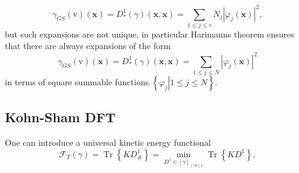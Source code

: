 \documentclass[aps,preprint]{revtex4}%
\begin{document}
\begin{equation}
\gamma_{GS}\left(  \mathrm{v}\right)  \left(  \mathbf{x}\right)  =D_{\ast}%
^{1}\left(  \gamma\right)  \left(  \mathbf{x,x}\right)  =\sum_{1\leq j\leq
r}N_{j}\left\vert \varphi_{j}\left(  \mathbf{x}\right)  \right\vert ^{2},
\end{equation}
but such expansions are not unique, in particular Harimanns \cite{Harimann}
theorem ensures that there are always expansions of the form
\begin{equation}
\gamma_{GS}\left(  \mathrm{v}\right)  \left(  \mathbf{x}\right)  =D_{\ast}%
^{1}\left(  \gamma\right)  \left(  \mathbf{x,x}\right)  =\sum_{1\leq j\leq
N}\left\vert \varphi_{j}\left(  \mathbf{x}\right)  \right\vert ^{2}%
\end{equation}
in terms of square summable functions $\left\{  \left.  \varphi_{j}\right\vert
1\leq j\leq N\right\}  $.

\subsection{Kohn-Sham DFT}

\bigskip One can introduce a universal kinetic energy functional
\[
\mathcal{F}_{T}\left(  \gamma\right)  =\operatorname{Tr}\left\{  KD_{\#}%
^{1}\right\}  =\min_{D^{1}\in\left[  \gamma\right]  _{\left\langle
N\right\rangle 1}}\operatorname{Tr}\left\{  KD^{1}\right\}  ,
\]
\end{document}
